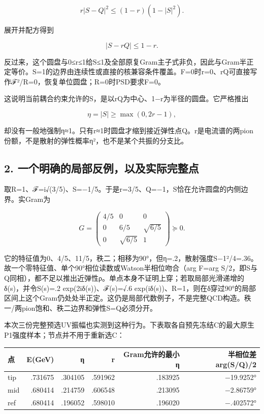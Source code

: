 \documentclass[
  10pt,
  a4paper,
]{article}
\newcounter{none} %
\begin{document}
\[
r|S-Q|^2\le(1-r)(1-|S|^2).
\]

展开并配方得到

\[
\boxed{|S-rQ|\le1-r.}
\]

反过来，这个圆盘与0≤r≤1给\textbar S\textbar≤1及全部原复Gram主子式非负，因此与Gram半正定等价。\textbar S\textbar=1的边界由连续性或直接的核兼容条件覆盖。F=0时r=0、rQ可直接写作ℱ²/R=0，恢复单位圆盘；R=0时PSD要求F=0。

这说明当前耦合约束允许的S，是以rQ为中心、1−r为半径的圆盘。它严格推出

\[
\eta=|S|\ge\max(0,2r-1),
\]

却没有一般地强制η≈1。只有r≈1时圆盘才缩到接近弹性点Q。r是电流谱的两pion份额，不是散射的弹性概率η²，也不是某个共振的分支比。

\subsection{2.
一个明确的局部反例，以及实际完整点}\label{ux4e00ux4e2aux660eux786eux7684ux5c40ux90e8ux53cdux4f8bux4ee5ux53caux5b9eux9645ux5b8cux6574ux70b9}

取R=1、ℱ=i√(3/5)、S=−1/5。于是r=3/5、Q=−1，S恰在允许圆盘的内侧边界。实Gram为

\[
G=\begin{pmatrix}
4/5&0&0\\
0&6/5&\sqrt{6/5}\\
0&\sqrt{6/5}&1
\end{pmatrix}\succeq0.
\]

它的特征值为0、4/5、11/5，秩二；相移为90°，但η=.2，散射强度\textbar S−1\textbar²/4=.36。故一个零特征值、单个90°相位读数或Watson半相位吻合（arg
F=arg
S/2，即S与Q同相），都不足以推出近弹性ρ。单点本身不证明上穿；若取局部光滑递增的δ(s)，并令S(s)=.2
exp(2iδ(s))、ℱ(s)=√.6
exp(iδ(s))、R=1，则在δ穿过90°的局部区间上这个Gram仍处处半正定。这仍是局部代数例子，不是完整QCD构造。秩一/两pion饱和、秩二边界和弹性S=Q必须分开。

本次三份完整预选UV振幅也实测到这种行为。下表取各自预先冻结C的最大原生P1强度样本；节点并不用于重新选C：

{\def\LTcaptype{none} %
\begin{longtable}[]{@{}lrrrrr@{}}
\toprule\noalign{}
点 & E(GeV) & η & r & Gram允许的最小η & 半相位差 arg(S/Q)/2 \\
\midrule\noalign{}
\endhead
\bottomrule\noalign{}
\endlastfoot
tip & .731675 & .304105 & .591962 & .183925 & −19.9252° \\
mid & .680414 & .214759 & .606548 & .213095 & −2.86759° \\
ref & .680414 & .196052 & .598010 & .196020 & −.402572° \\
\end{longtable}
}
\end{document}
